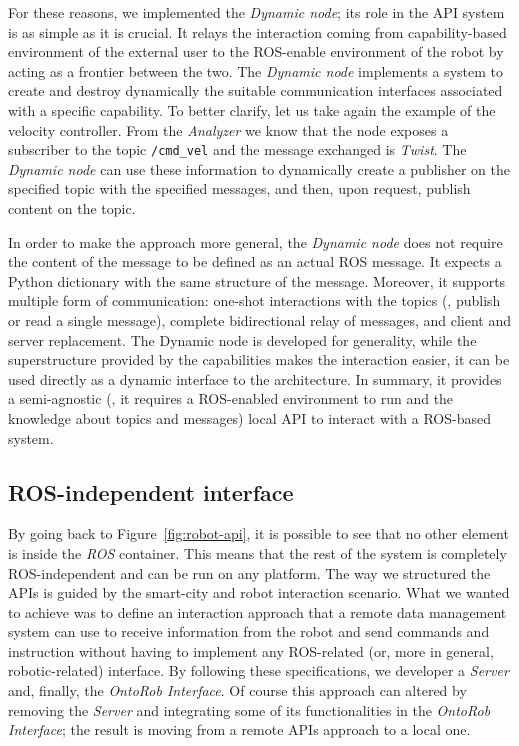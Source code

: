 For these reasons, we implemented the \textit{Dynamic node}; its role in the API system is as simple as it is crucial. It relays the interaction coming from capability-based environment of the external user to the ROS-enable environment of the robot by acting as a frontier between the two. The \textit{Dynamic node} implements a system to create and destroy dynamically the suitable communication interfaces associated with a specific capability. To better clarify, let us take again the example of the velocity controller. From the \textit{Analyzer} we know that the node exposes a subscriber to the topic \texttt{/cmd\_vel} and the message exchanged is \textit{Twist}. The \textit{Dynamic node} can use these information to dynamically create a publisher on the specified topic with the specified messages, and then, upon request, publish content on the topic.

In order to make the approach more general, the \textit{Dynamic node} does not require the content of the message to be defined as an actual ROS message. It expects a Python dictionary with the same structure of the message. Moreover, it supports multiple form of communication: one-shot interactions with the topics (\ie, publish or read a single message), complete bidirectional relay of messages, and client and server replacement. The {Dynamic node} is developed for generality, while the superstructure provided by the capabilities makes the interaction easier, it can be used directly as a dynamic interface to the architecture. In summary, it provides a semi-agnostic (\ie, it requires a ROS-enabled environment to run and the knowledge about topics and messages) local API to interact with a ROS-based system.

\subsection{ROS-independent interface}
By going back to Figure~\ref{fig:robot-api}, it is possible to see that no other element is inside the \textit{ROS} container. This means that the rest of the system is completely ROS-independent and can be run on any platform. The way we structured the APIs is guided by the smart-city and robot interaction scenario. What we wanted to achieve was to define an interaction approach that a remote data management system can use to receive information from the robot and send commands and instruction without having to implement any ROS-related (or, more in general, robotic-related) interface. By following these specifications, we developer a \textit{Server} and, finally, the \textit{OntoRob Interface}. Of course this approach can altered by removing the \textit{Server} and integrating some of its functionalities in the \textit{OntoRob Interface}; the result is moving from a remote APIs approach to a local one.

